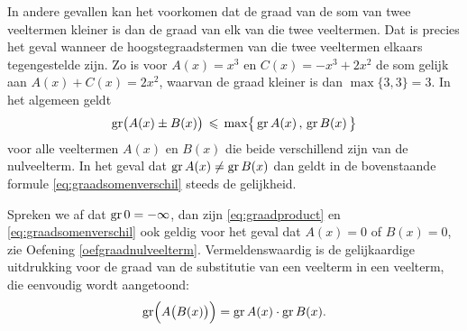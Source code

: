 \documentclass{ximera}
\begin{document}
In andere gevallen kan het voorkomen dat de graad van de som van twee veeltermen kleiner is dan de graad van elk van die twee veeltermen. Dat is precies het geval wanneer de hoogste\-graadstermen van die twee veeltermen elkaars tegengestelde zijn. Zo is voor $A(x) = x^3$ en $C(x) = -x^3 + 2x^2$ de som gelijk aan $A(x) + C(x) = 2x^2$, waarvan de graad kleiner is dan $\max\{3,3\} = 3$. In het algemeen geldt  
\begin{equation} 
\operatorname{gr}\bigl( A(x) \pm B(x) \bigr) \, \leqslant \, \max \bigl\{ \,\operatorname{gr} A(x)\, , \, \operatorname{gr} B(x) \, \bigr\}
\end{equation}
voor alle veeltermen $A(x)$ en $B(x)$ die beide verschillend zijn van de nulveelterm. In het geval dat $\operatorname{gr} A(x) \neq \operatorname{gr} B(x)$ dan geldt in de bovenstaande formule \eqref{eq:graadsomenverschil} steeds de gelijkheid. 





\begin{xmuitweiding}
Spreken we af dat $\operatorname{gr} 0 = - \infty$, dan zijn \eqref{eq:graadproduct} en \eqref{eq:graadsomenverschil} ook geldig voor het geval dat $A(x) = 0$ of $B(x) = 0$, zie Oefening \ref{oefgraadnulveelterm}. Vermeldenswaardig is de gelijkaardige uitdrukking voor de graad van de substitutie van een veelterm in een veelterm, die eenvoudig wordt aangetoond:
\[
\operatorname{gr}\Bigl(A\bigl(B(x)\bigr)\Bigr) = \operatorname{gr} A(x) \cdot \operatorname{gr} B(x).
\]
\end{xmuitweiding}
\end{document}
